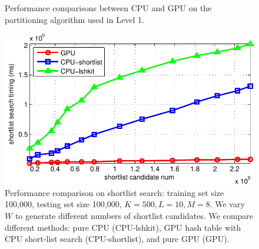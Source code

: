 \begin{figure}[t]
  \caption[Performance comparisons between CPU-based and GPU-based partitioning components in Bi-level LSH]{\label{fig:6:res:level1} Performance comparisons between CPU and GPU on the partitioning algorithm used in Level 1.}
\end{figure}


\begin{figure}[t]
  \centering
  \includegraphics[width=0.8\linewidth]{figs/6/res/shortlist.pdf}
  \caption[Performance comparison on shortlist search used in Bi-level LSH]{\label{fig:6:res:shortlist} Performance comparison on shortlist search: training set size 100,000, testing set size 100,000, $K=500, L=10, M=8$. We vary $W$ to generate different numbers of shortlist candidates. We compare different methods: pure CPU (CPU-lshkit), GPU hash table with CPU short-list search (CPU-shortlist), and pure GPU (GPU).}
\end{figure}



